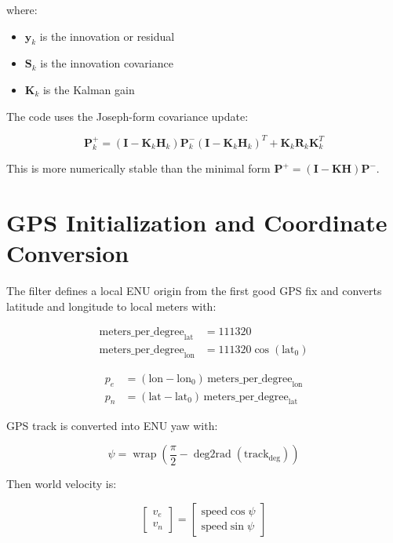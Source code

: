 \documentclass[11pt]{article}
\newcommand{\vect}[1]{\boldsymbol{#1}}
\newcommand{\mat}[1]{\mathbf{#1}}
\begin{document}
where:

\begin{itemize}
    \item $\vect{y}_k$ is the innovation or residual
    \item $\mat{S}_k$ is the innovation covariance
    \item $\mat{K}_k$ is the Kalman gain
\end{itemize}

The code uses the Joseph-form covariance update:

\begin{equation}
\mat{P}_k^+ =
(\mat{I} - \mat{K}_k\mat{H}_k)\mat{P}_k^-(\mat{I} - \mat{K}_k\mat{H}_k)^T
+ \mat{K}_k\mat{R}_k\mat{K}_k^T
\end{equation}

This is more numerically stable than the minimal form $ \mat{P}^+ = (\mat{I} - \mat{K}\mat{H})\mat{P}^- $.

\section{GPS Initialization and Coordinate Conversion}

The filter defines a local ENU origin from the first good GPS fix and converts latitude and longitude to local meters with:

\begin{align}
\text{meters\_per\_degree}_{\text{lat}} &= 111320 \\
\text{meters\_per\_degree}_{\text{lon}} &= 111320\cos(\text{lat}_0)
\end{align}

\begin{align}
p_e &= (\text{lon} - \text{lon}_0)\,\text{meters\_per\_degree}_{\text{lon}} \\
p_n &= (\text{lat} - \text{lat}_0)\,\text{meters\_per\_degree}_{\text{lat}}
\end{align}

GPS track is converted into ENU yaw with:

\begin{equation}
\psi = \operatorname{wrap}\left(\frac{\pi}{2} - \operatorname{deg2rad}(\text{track}_{\deg})\right)
\end{equation}

Then world velocity is:

\begin{equation}
\begin{bmatrix}
v_e \\ v_n
\end{bmatrix}
=
\begin{bmatrix}
\text{speed}\cos\psi \\
\text{speed}\sin\psi
\end{bmatrix}
\end{equation}
\end{document}
